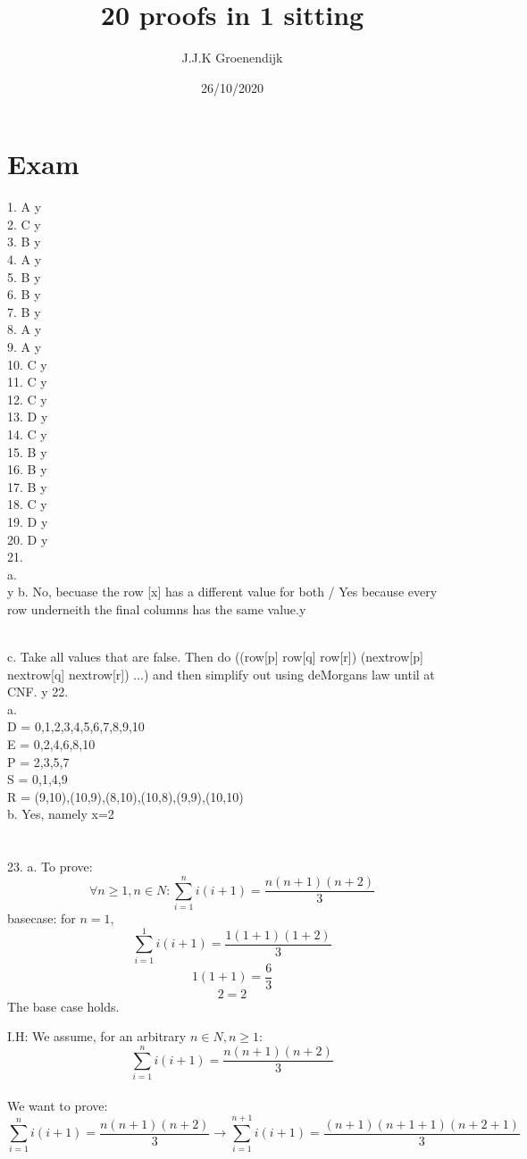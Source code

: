 \documentclass{article}
\title{20 proofs in 1 sitting}
\author{J.J.K Groenendijk}
\date{26/10/2020}
\begin{document}
\section{Exam}

1. A y\\
2. C y\\
3. B y\\
4. A y\\
5. B y\\
6. B y\\
7. B y\\
8. A y\\
9. A y\\
10. C y\\
11. C y\\
12. C y\\
13. D y\\
14. C y\\
15. B y\\
16. B y\\
17. B y\\
18. C y\\
19. D y\\
20. D y\\
21. \\
 a. \\
[insert truth table] y
 b. No, becuase the row [x] has a different value for both / Yes because every row underneith the final columns has the same value.y
 
 \\c. Take all values that are false. Then do \neg((row[p] \land row[q] \land row[r]) \lor (nextrow[p] \land nextrow[q] \land nextrow[r]) \lor ...) and then simplify out using deMorgans law until at CNF. 
 y
22. \\
 a.\\
 D = {0,1,2,3,4,5,6,7,8,9,10}\\
 E = {0,2,4,6,8,10}\\
 P = {2,3,5,7}\\
 S = {0,1,4,9}\\
 R = {(9,10),(10,9),(8,10),(10,8),(9,9),(10,10)}\\
 b. Yes, namely x=2\\
 \\
 \\
23.
a.
To prove: $$\forall n \geq 1, n \in N: \sum_{i=1}^{n}i(i+1) = \frac{n(n+1)(n+2)}{3}$$
basecase: for $n=1$, $$\sum_{i=1}^{1}i(i+1) = \frac{1(1+1)(1+2)}{3}$$ 
$$1(1+1) = \frac{6}{3}$$
$$2 = 2$$
The base case holds.

I.H: We assume, for an arbitrary $n \in N,n \geq 1$:
$$\sum_{i=1}^{n}i(i+1) = \frac{n(n+1)(n+2)}{3}$$\\
We want to prove: $$\sum_{i=1}^{n}i(i+1) = \frac{n(n+1)(n+2)}{3} \rightarrow \sum_{i=1}^{n+1}i(i+1) = \frac{(n+1)(n+1+1)(n+2+1)}{3}$$
\end{document}
